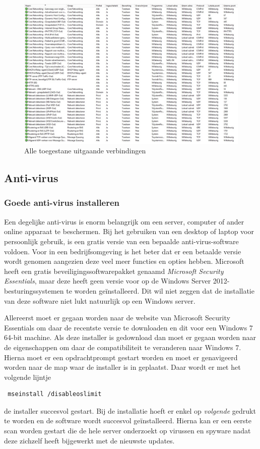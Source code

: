 \documentclass[pdftex,a4paper,12pt]{report}
\begin{document}
\begin{figure}[H]
\begin{center}
\includegraphics[scale=0.45]{img/FirewallUitgaand}
\end{center}
\caption{Alle toegestane uitgaande verbindingen}
\label{img:FirewallUitgaand}
\end{figure}

\subsection{Anti-virus}
\subsubsection{Goede anti-virus installeren}
Een degelijke anti-virus is enorm belangrijk om een server, computer of ander online apparaat te beschermen. Bij het gebruiken van een desktop of laptop voor persoonlijk gebruik, is een gratis versie van een bepaalde anti-virus-software voldoen. Voor in een bedrijfsomgeving is het beter dat er een betaalde versie wordt genomen aangezien deze veel meer functies en opties hebben. Microsoft heeft een gratis beveiligingssoftwarepakket genaamd \textit{Microsoft Security Essentials}, maar deze heeft geen versie voor op de Windows Server 2012-besturingssystemen te worden geïnstalleerd. Dit wil niet zeggen dat de installatie van deze software niet lukt natuurlijk op een Windows server.

Allereerst moet er gegaan worden naar de website van Microsoft Security Essentials om daar de recentste versie te downloaden en dit voor een Windows 7 64-bit machine. Als deze installer is gedownload dan moet er gegaan worden naar de eigenschappen om daar de compatibiliteit te veranderen naar Windows 7. Hierna moet er een opdrachtprompt gestart worden en moet er genavigeerd worden naar de map waar de installer is in geplaatst. Daar wordt er met het volgende lijntje \begin{verbatim} mseinstall /disableoslimit \end{verbatim} de installer succesvol gestart. Bij de installatie hoeft er enkel op \textit{volgende} gedrukt te worden en de software wordt succesvol geïnstalleerd. Hierna kan er een eerste scan worden gestart die de hele server onderzoekt op virussen en spyware nadat deze zichzelf heeft bijgewerkt met de nieuwste updates. \citep{Herring2014}
\end{document}
